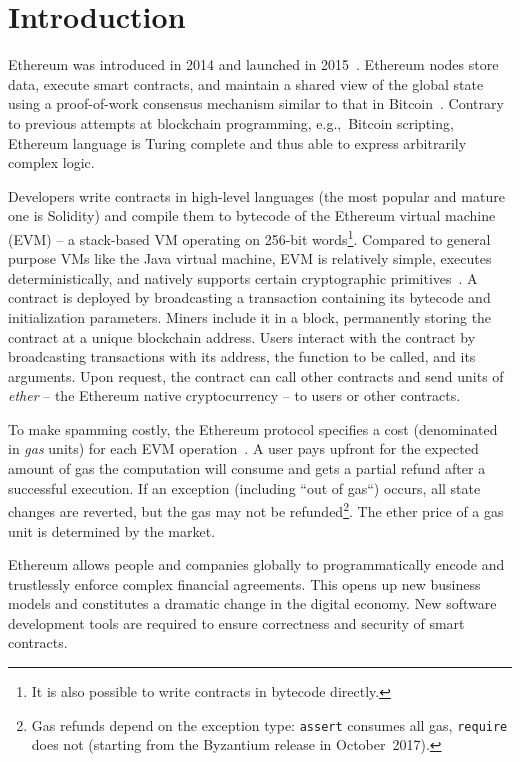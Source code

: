 \section{Introduction}

Ethereum was introduced in 2014 and launched in 2015~\cite{Buterin2014}.
Ethereum nodes store data, execute smart contracts, and maintain a shared view of the global state using a proof-of-work consensus mechanism similar to that in Bitcoin~\cite{Tikhomirov2017}.
Contrary to previous attempts at blockchain programming, e.g.,~Bitcoin scripting, Ethereum language is Turing complete and thus able to express arbitrarily complex logic.

Developers write contracts in high-level languages (the most popular and mature one is Solidity) and compile them to bytecode of the Ethereum virtual machine (EVM) -- a stack-based VM operating on 256-bit words\footnote{It is also possible to write contracts in bytecode directly.}.
Compared to general purpose VMs like the Java virtual machine, EVM is relatively simple, executes deterministically, and natively supports certain cryptographic primitives~\cite{Buterin2017}.
A contract is deployed by broadcasting a transaction containing its bytecode and initialization parameters.
Miners include it in a block, permanently storing the contract at a unique blockchain address.
Users interact with the contract by broadcasting transactions with its address, the function to be called, and its arguments.
Upon request, the contract can call other contracts and send units of \textit{ether} -- the Ethereum native cryptocurrency -- to users or other contracts.

To make spamming costly, the Ethereum protocol specifies a cost (denominated in \textit{gas} units) for each EVM operation~\cite{Wood2014}.
A user pays upfront for the expected amount of gas the computation will consume and gets a partial refund after a successful execution.
If an exception (including ``out of gas``) occurs, all state changes are reverted, but the gas may not be refunded\footnote{Gas refunds depend on the exception type: \texttt{assert} consumes all gas, \texttt{require} does not (starting from the Byzantium release in October~2017).}.
The ether price of a gas unit is determined by the market.

Ethereum allows people and companies globally to programmatically encode and trustlessly enforce complex financial agreements.
This opens up new business models and constitutes a dramatic change in the digital economy.
New software development tools are required to ensure correctness and security of smart contracts.


